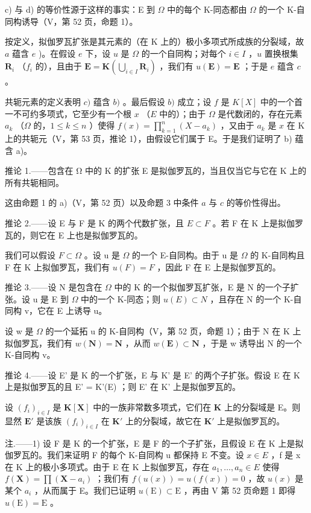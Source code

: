 c) 与 d) 的等价性源于这样的事实：E 到 \(\Omega\) 中的每个 K-同态都由 \(\Omega\) 的一个 K-自同构诱导（V，第 52 页，命题 1）。

按定义，拟伽罗瓦扩张是其元素的（在 K 上的）极小多项式所成族的分裂域，故 \(a\) 蕴含 \(e\) )。在假设 \(e\) 下，设 \(u\) 是 \(\Omega\) 的一个自同构；对每个 \(i \in I\) ，\(u\) 置换根集 \(\mathbf{R}_i\) （\(f_i\) 的），且由于 \(\mathbf{E} = \mathbf{K}\left(\bigcup_{i \in I} \mathbf{R}_i\right)\) ，我们有 \(u(\mathbf{E}) = \mathbf{E}\) ；于是 \(e\) 蕴含 \(c\) 。

共轭元素的定义表明 \(c)\) 蕴含 \(b)\) 。最后假设 \(b)\) 成立；设 \(f\) 是 \(K[X]\) 中的一个首一不可约多项式，它至少有一个根 \(x\) （\(E\) 中的）；由于 \(\Omega\) 是代数闭的，存在元素 \(a_k\) （\(\Omega\) 的，\(1 \leqslant k \leqslant n\) ）使得 \(f(x) = \prod_{k=1}^{n} (X - a_k)\) ，又由于 \(a_k\) 是 \(x\) 在 K 上的共轭元（V，第 53 页，推论 1），由假设它们属于 E。于是我们证明了 b) 蕴含 a)。

推论 1.——包含在 Ω 中的 K 的扩张 E 是拟伽罗瓦的，当且仅当它与它在 K 上的所有共轭相同。

这由命题 1 的 a)（V，第 52 页）以及命题 3 中条件 \(a\) 与 \(c\) 的等价性得出。

推论 2.——设 E 与 F 是 K 的两个代数扩张，且 \(E \subset F\) 。若 F 在 K 上是拟伽罗瓦的，则它在 E 上也是拟伽罗瓦的。

我们可以假设 \(F \subset \Omega\) 。设 u 是 \(\Omega\) 的一个 E-自同构。由于 u 是 \(\Omega\) 的 K-自同构且 F 在 K 上拟伽罗瓦，我们有 \(u(F) = F\) ，因此 F 在 E 上是拟伽罗瓦的。

推论 3.——设 N 是包含在 \(\Omega\) 中的 K 的一个拟伽罗瓦扩张，E 是 N 的一个子扩张。设 u 是 E 到 \(\Omega\) 中的一个 K-同态；则 \(u(E) \subset N\) ，且存在 N 的一个 K-自同构 v，它在 E 上诱导 u。

设 w 是 \(\Omega\) 的一个延拓 u 的 K-自同构（V，第 52 页，命题 1）；由于 N 在 K 上拟伽罗瓦，我们有 \(w(\mathbf{N}) = \mathbf{N}\) ，从而 \(w(\mathbf{E}) \subset \mathbf{N}\) ，于是 w 诱导出 N 的一个 K-自同构 v。

推论 4.——设 E' 是 K 的一个扩张，E 与 K' 是 E' 的两个子扩张。假设 E 在 K 上是拟伽罗瓦的且 E' = K'(E) ；则 E' 在 K' 上是拟伽罗瓦的。

设 \((f_i)_{i\in I}\) 是 \(\mathbf{K}[\mathbf{X}]\) 中的一族非常数多项式，它们在 \(\mathbf{K}\) 上的分裂域是 E。则显然 \(\mathbf{E}'\) 是该族 \((f_i)_{i\in I}\) 在 \(\mathbf{K}'\) 上的分裂域，故它在 \(\mathbf{K}'\) 上是拟伽罗瓦的。

注.——1) 设 F 是 K 的一个扩张，E 是 F 的一个子扩张，且假设 E 在 K 上是拟伽罗瓦的。我们来证明 F 的每个 K-自同构 u 都保持 E 不变。设 \(x \in E\) ，f 是 x 在 K 上的极小多项式。由于 E 在 K 上拟伽罗瓦，存在 \(a_{1}, \ldots, a_{n} \in E\) 使得 \(f(\mathbf{X}) = \prod(\mathbf{X} - a_{i})\) ；我们有 \(f(u(x)) = u(f(x)) = 0\) ，故 \(u(x)\) 是某个 \(a_{i}\) ，从而属于 E。我们已证明 \(u(\mathrm{E}) \subset \mathrm{E}\) ，再由 V 第 52 页命题 1 即得 \(u(\mathrm{E}) = \mathrm{E}\) 。

